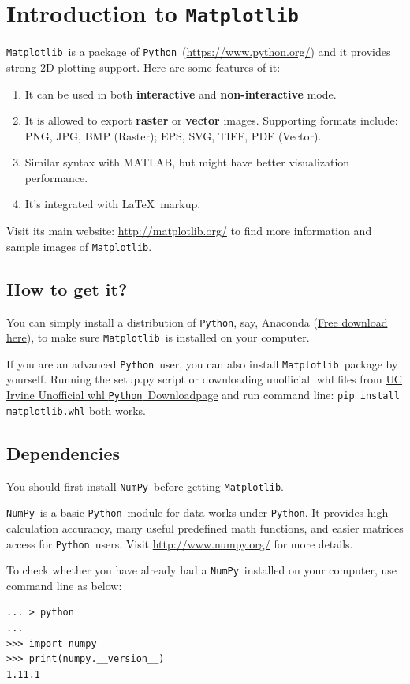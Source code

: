 \documentclass{report}
\newcommand{\pkg}[1]{\texttt{#1}}
\newcommand{\Py}{\pkg{Python}}
\newcommand{\NumPy}{\pkg{NumPy}}
\newcommand{\mpl}{\texttt{Matplotlib}}
\newcommand{\Emph}[1]{\textcolor{cyan!80!white}{{\bfseries #1}}}
\begin{document}
\tableofcontents

\listoffigures

\chapter{Introduction to \mpl}
\mpl\ is a package of \Py\ (\url{https://www.python.org/}) and it provides strong 2D plotting support. Here are some features of it:
\begin{enumerate}
\item It can be used in both \Emph{interactive} and \Emph{non-interactive} mode.
\item It is allowed to export \Emph{raster} or \Emph{vector} images. Supporting formats include: PNG, JPG, BMP (Raster); EPS, SVG, TIFF, PDF (Vector).
\item Similar syntax with MATLAB, but might have better visualization performance.
\item It's integrated with \LaTeX\ markup.
\end{enumerate}

Visit its main website: \url{http://matplotlib.org/} to find more information and sample images of \mpl . 

\section{How to get it?}
You can simply install a distribution of \Py, say, Anaconda (\href{https://www.continuum.io/downloads}{Free download here}), to make sure \mpl\ is installed on your computer. 

If you are an advanced \Py\ user, you can also install \mpl\ package by yourself. Running the setup.py script or downloading unofficial .whl files from \href{http://www.lfd.uci.edu/~gohlke/pythonlibs/#matplotlib}{UC Irvine Unofficial whl \Py\ Downloadpage} and run command line: \texttt{pip install matplotlib.whl} both works.

\section{Dependencies}
You should first install \NumPy\ before getting \mpl .

\NumPy\ is a basic \Py\ module for data works under \Py . It provides high calculation accurancy, many useful predefined math functions, and easier matrices access for \Py\ users. Visit \url{http://www.numpy.org/} for more details.

To check whether you have already had a \NumPy\ installed on your computer, use command line as below:
\begin{verbatim}
... > python
...
>>> import numpy
>>> print(numpy.__version__)
1.11.1
\end{verbatim}
\end{document}
